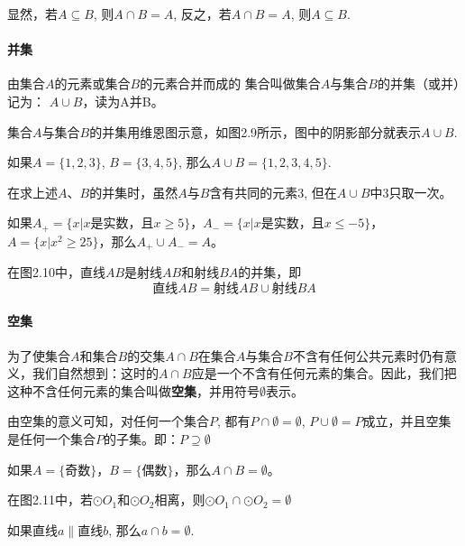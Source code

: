 显然，若$A\subseteq B$, 则$A\cap B=A$, 反之，若$A\cap B=A$, 则$A\subseteq B$.

\paragraph{并集}
由集合$A$的元素或集合$B$的元素合并而成的
集合叫做集合$A$与集合$B$的并集（或并）记为：
$A\cup B$，读为A并B。

集合$A$与集合$B$的并集用维恩图示意，如图2.9所示，图中的阴影部分就表示$A\cup B$.

如果$A=\{1, 2, 3\}$, $B=\{3, 4, 5\}$, 那么$A\cup B= \{1, 2, 3, 4, 5\}$.

\begin{rmk}
	在求上述$A$、$B$的并集时，虽然$A$与$B$含有共同的元素3, 但在$A\cup B$中3只取一次。
\end{rmk}

如果$A_+=\{x|x\text{是实数，且}x\ge 5\}$，$A_-=\{x|x\text{是实数，且}x\le -5\}$，$A=\{x|x^2\ge 25\}$，那么$A_+\cup A_-=A$。

在图2.10中，直线$AB$是射线$AB$和射线$BA$的并集，即
\[\text{直线}AB=\text{射线}AB \cup \text{射线}BA\]

\paragraph{空集}
为了使集合$A$和集合$B$的交集$A\cap B$在集合$A$与集合$B$不含有任何公共元素时仍有意义，我们自然想到：这时的$A\cap B$应是一个不含有任何元素的集合。因此，我们把这种不含任何元素的集合叫做\textbf{空集}，并用符号$\emptyset$表示。

由空集的意义可知，对任何一个集合$P$, 都有$P\cap \emptyset=\emptyset$, $P\cup\emptyset=P$成立，并且空集是任何一个集合$P$的子集。即：$P\supseteq \emptyset$

如果$A=\{\text{奇数}\}$，$B=\{\text{偶数}\}$，那么$A\cap B=\emptyset$。

在图2.11中，若$\odot O_1$和$\odot O_2$相离，则$\odot O_1\cap \odot O_2=\emptyset$
\begin{figure}[htp]
	\centering
	\caption{}
\end{figure}

如果直线$a\parallel$直线$b$, 那么$a\cap b=\emptyset$.

